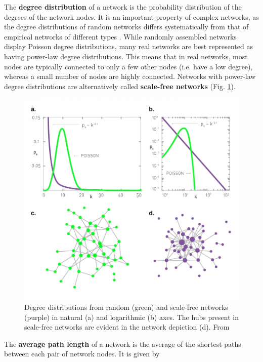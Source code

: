 The \textbf{degree distribution} of a network is the probability distribution of the degrees of the network nodes. It is an important property of complex networks, as the degree distributions of random networks differs systematically from that of empirical networks of different types \citep{Barabasi1999}. While randomly assembled networks display Poisson degree distributions, many real networks are best represented as having power-law degree distributions. This means that in real networks, most nodes are typically connected to only a few other nodes (i.e. have a low degree), whereas a small number of nodes are highly connected. Networks with power-law degree distributions are alternatively called \textbf{scale-free networks} (Fig. \ref{fig:scale_free}).

\begin{figure}[ht]
\includegraphics[width=\textwidth]{./Figures/intro/network_theory/degree_distrib_Barabasi2016.jpg}
\caption[Random and scale-free degree distributions]{\color{Gray} Degree distributions from random (green) and scale-free networks (purple) in natural (a) and logarithmic (b) axes. The hubs present in scale-free networks are evident in the network depiction (d). From \cite{Barabasi2016}}
\label{fig:scale_free}
\end{figure}

The \textbf{average path length} of a network is the average of the shortest paths between each pair of network nodes. It is given by

